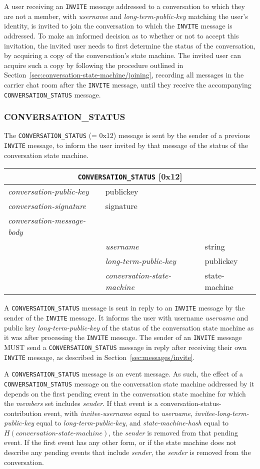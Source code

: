 \documentclass{article}
\def\npmessage#1{\texttt{#1}}
\def\field#1{\textit{#1}}
\def\smfield#1{\textsl{#1}}
\def\type#1{\textsf{#1}}
\newenvironment{conversationmessage}[2]{
\newcommand{\messagefield}[2]{
& \field{##1} & \type{##2} \\
\hline
}
\hspace{2em minus 2em}\begin{tabular}{|l|l|l|}
\hline
\multicolumn{3}{|c|}{\npmessage{#1} [#2]} \\
\hline
\hline
\field{conversation-public-key} & \multicolumn{2}{l|}{\type{publickey}} \\
\hline
\field{conversation-signature} & \multicolumn{2}{l|}{\type{signature}} \\
\hline
\field{conversation-message-body} & \multicolumn{2}{l|}{} \\
\hline
}{
\end{tabular}
}
\begin{document}
A user receiving an \npmessage{INVITE} message addressed to a conversation to which they are not a member, with \field{username} and \field{long-term-public-key} matching the user's identity, is invited to join the conversation to which the \npmessage{INVITE} message is addressed.
To make an informed decision as to whether or not to accept this invitation, the invited user needs to first determine the status of the conversation, by acquiring a copy of the conversation's state machine.
The invited user can acquire such a copy by following the procedure outlined in Section~\ref{sec:conversation-state-machine/joining}, recording all messages in the carrier chat room after the \npmessage{INVITE} message, until they receive the accompanying \npmessage{CONVERSATION\_STATUS} message.


\subsubsection{CONVERSATION\_STATUS}
\label{sec:messages/conversation-status}

The \npmessage{CONVERSATION\_STATUS} (= 0x12) message is sent by the sender of a previous \npmessage{INVITE} message, to inform the user invited by that message of the status of the conversation state machine.

\begin{conversationmessage}{CONVERSATION\_STATUS}{0x12}
\messagefield{username}{string}
\messagefield{long-term-public-key}{publickey}
\messagefield{conversation-state-machine}{state-machine}
\end{conversationmessage}

A \npmessage{CONVERSATION\_STATUS} message is sent in reply to an \npmessage{INVITE} message by the sender of the \npmessage{INVITE} message.
It informs the user with username \field{username} and public key \field{long-term-public-key} of the status of the conversation state machine as it was after processing the \npmessage{INVITE} message.
The sender of an \npmessage{INVITE} message MUST send a \npmessage{CONVERSATION\_STATUS} message in reply after receiving their own \npmessage{INVITE} message, as described in Section~\ref{sec:messages/invite}.

A \npmessage{CONVERSATION\_STATUS} message is an event message.
As such, the effect of a \npmessage{CONVERSATION\_STATUS} message on the conversation state machine addressed by it depends on the first pending event in the conversation state machine for which the \smfield{members} set includes \field{sender}.
If that event is a \type{conversation-status-contribution} event, with \smfield{invitee-username} equal to \field{username}, \smfield{invitee-long-term-public-key} equal to \field{long-term-public-key}, and \smfield{state-machine-hash} equal to $H(\field{conversation-state-machine})$, the \field{sender} is removed from that pending event.
If the first event has any other form, or if the state machine does not describe any pending events that include \field{sender}, the \field{sender} is removed from the conversation.
\end{document}
